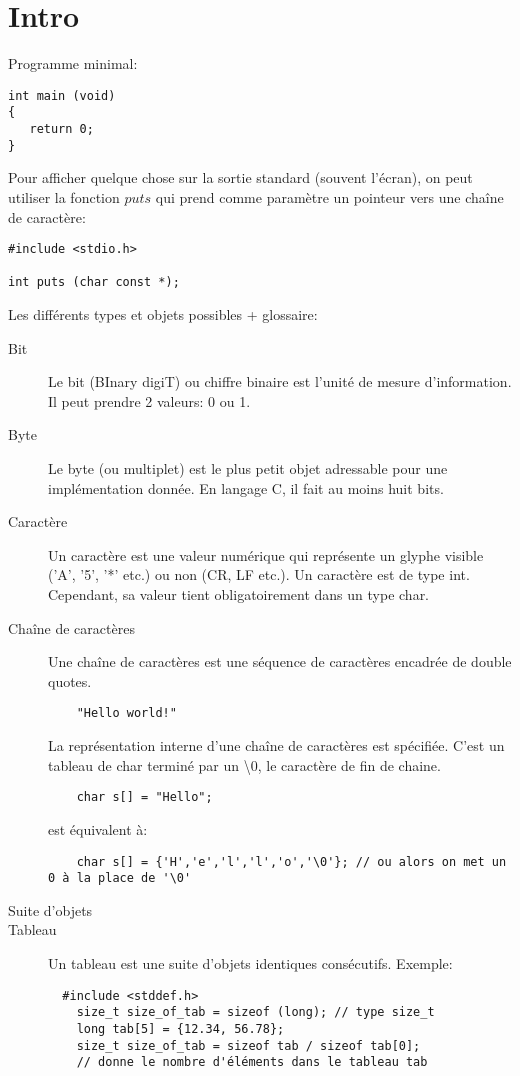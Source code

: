 \documentclass[a4paper]{article}
\begin{document}
\section{Intro}
Programme minimal:
\begin{lstlisting}
int main (void)
{
   return 0;
}
\end{lstlisting}
Pour afficher quelque chose sur la sortie standard (souvent l'écran), on peut utiliser la fonction $puts$ qui prend comme paramètre un pointeur vers une chaîne de caractère:
\begin{lstlisting}
#include <stdio.h>

int puts (char const *);
\end{lstlisting}
Les différents types et objets possibles + glossaire:
\begin{description}
  \item [Bit] Le bit (BInary digiT) ou chiffre binaire est l'unité de mesure d'information. Il peut prendre 2 valeurs: 0 ou 1.
  \item [Byte] Le byte (ou multiplet) est le plus petit objet adressable pour une implémentation donnée. En langage C, il fait au moins huit bits.
  \item [Caractère] Un caractère est une valeur numérique qui représente un glyphe visible ('A', '5', '*' etc.) ou non (CR, LF etc.). Un caractère est de type int. Cependant, sa valeur tient obligatoirement dans un type char.
  \item [Chaîne de caractères] Une chaîne de caractères est une séquence de caractères encadrée de double quotes. \newline
  \begin{lstlisting}
    "Hello world!"
  \end{lstlisting}
  La représentation interne d'une chaîne de caractères est spécifiée. C'est un tableau de char terminé par un \guillemotleft{}\textbackslash0\guillemotright{}, le caractère de fin de chaine.
  \begin{lstlisting}
    char s[] = "Hello";
  \end{lstlisting}

  est équivalent à:
  \begin{lstlisting}
    char s[] = {'H','e','l','l','o','\0'}; // ou alors on met un 0 à la place de '\0'
  \end{lstlisting}

  \item [\guillemotleft{}Suite d'objets\guillemotright{}]
  \item [Tableau] Un tableau est une suite d'objets identiques consécutifs.\newline
  Exemple:
  \begin{lstlisting}
  #include <stddef.h>
    size_t size_of_tab = sizeof (long); // type size_t
    long tab[5] = {12.34, 56.78};
    size_t size_of_tab = sizeof tab / sizeof tab[0];
    // donne le nombre d'éléments dans le tableau tab
  \end{lstlisting}


\end{description}
\end{document}
